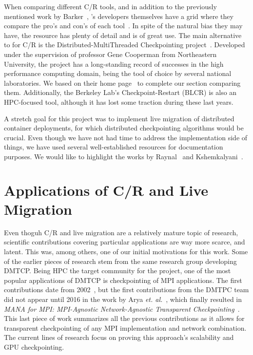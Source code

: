 When comparing different C/R tools, and in addition to the previously mentioned work by Barker~\cite{Barker2014}, \criu's developers themselves have a grid where they compare the pro's and con's of each tool~\cite{criu-comparison}.
In spite of the natural bias they may have, the resource has plenty of detail and is of great use.
The main alternative to \criu for C/R is the Distributed-MultiThreaded Checkpointing project~\cite{Ansel2009}.
Developed under the supervision of professor Gene Cooperman from Northeastern University, the project has a long-standing record of successes in the high performance computing domain, being the tool of choice by several national laboratories.
We based on their home page~\cite{dmtcp} to complete our section comparing them.
Additionally, the Berkeley Lab's Checkpoint-Restart (BLCR) is also an HPC-focused tool, although it has lost some traction during these last years. 

A stretch goal for this project was to implement live migration of distributed container deployments, for which distributed checkpointing algorithms would be crucial.
Even though we have not had time to address the implementation side of things, we have used several well-established resources for documentation purposes.
We would like to highlight the works by Raynal~\cite{Raynal2013} and Kshemkalyani~\cite{Kshemkalyani2008}.

\section{Applications of C/R and Live Migration}

Even thoguh C/R and live migration are a relatively mature topic of research, scientific contributions covering particular applications are way more scarce, and latent.
This was, among others, one of our initial motivations for this work.
Some of the earlier pieces of research stem from the same research group developing DMTCP.
Being HPC the target community for the project, one of the most popular applications of DMTCP is checkpointing of MPI applications.
The first contributions date from 2002~\cite{Bosilca2002}, but the first contributions from the DMTPC team did not appear until 2016 in the work by Arya \textit{et. al.}~\cite{Arya2016}, which finally resulted in \textit{MANA for MPI: MPI-Agnostic Network-Agnostic Transparent Checkpointing}~\cite{Garg2019}.
This last piece of work summarizes all the previous contributions as it allows for transparent checkpointing of any MPI implementation and network combination.
The current lines of research focus on proving this approach's scalability and GPU checkpointing.

